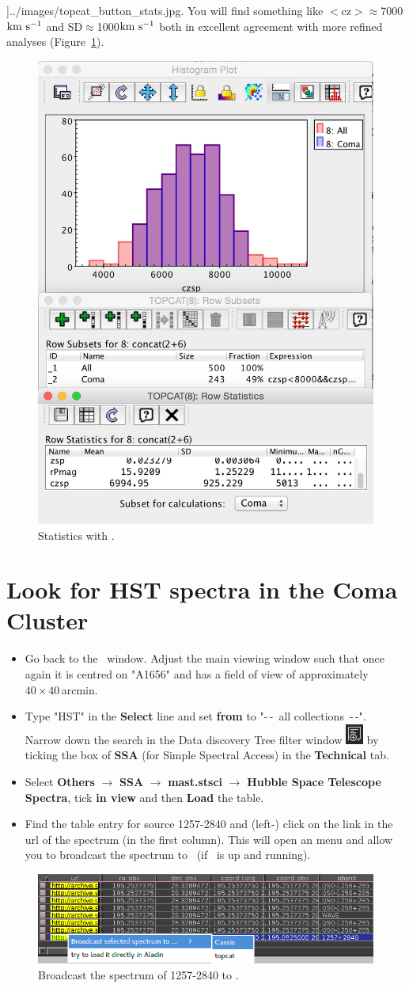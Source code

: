 \documentclass [a4paper, 12pt]{article}
\begin{document}
\begin{itemize}
\textwidth]{../images/topcat_button_stats.jpg}. You will find something like
$<$cz$>\approx$7000$\rm km\ s^{-1}$ and SD$\approx$1000$\rm km\ s^{-1}$ both in excellent agreement
with more refined analyses (Figure~\ref{fig:topstats}).
\begin{figure}[H]
\center
\includegraphics[width=0.33  \textwidth]{../images/topcat_hist-stat_coma.jpg}
\caption{Statistics with \topcat.}
\label{fig:topstats}
\end{figure}
\end{itemize}

\section{Look for HST spectra in the Coma Cluster}

\begin{itemize}
\item Go back to the \aladin\ window. Adjust the main viewing window such that
once again it is centred on "A1656" and has a field of view of approximately
$40\times40$\,arcmin.
\item Type "HST" in the \textbf{Select} line and set \textbf{from} to "-\,-~all
collections~-\,-". Narrow down the search in the Data discovery Tree filter
window \includegraphics[width=0.03
\textwidth]{../images/aladin_button_filtertree.png} by ticking the box of
\textbf{SSA} (for Simple Spectral Access) in the \textbf{Technical} tab.
\item Select \textbf{Others} $\rightarrow$ \textbf{SSA} $\rightarrow$
\textbf{mast.stsci} $\rightarrow$ \textbf{Hubble Space Telescope Spectra}, tick
\textbf{in view} and then \textbf{Load} the table.
\item Find the table entry for source 1257-2840 and (left-) click on the link
in the url of the spectrum (in the first column). This will open an menu and
allow you to broadcast the spectrum to \cassis\ (if \cassis\ is up and
running).
\end{itemize}
\begin{figure}[H]
    \center
    \includegraphics[width=0.6
    \textwidth]{../images/aladin_send_HSTspec_cassis.png}
    \caption{Broadcast the spectrum of 1257-2840 to \cassis.}
    \label{fig:broadcastspectrum}
\end{figure}
\end{document}

